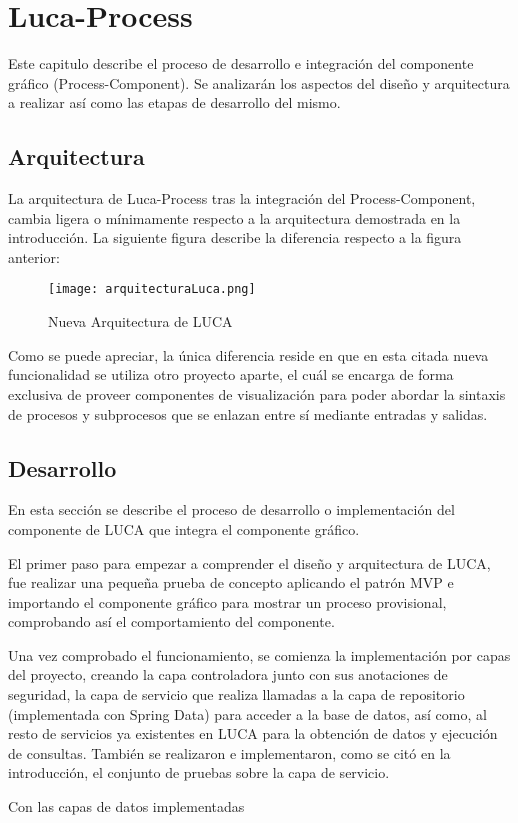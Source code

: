 \chapter{Luca-Process}
	
Este capitulo describe el proceso de desarrollo e integración del componente gráfico (Process-Component). Se analizarán los aspectos del diseño y arquitectura a realizar así como las etapas de desarrollo del mismo.
	
\section{Arquitectura}

La arquitectura  de Luca-Process tras la integración del Process-Component, cambia ligera o mínimamente respecto a la arquitectura demostrada en la introducción. La siguiente figura describe la diferencia respecto a la figura anterior:

\begin{figure}[H]
	\centering
	\texttt{[image: arquitecturaLuca.png]}
	\caption{Nueva Arquitectura de LUCA}\label{fig:arquitecturaLuca}
\end{figure}

Como se puede apreciar, la única diferencia reside en que en esta citada nueva funcionalidad se utiliza otro proyecto aparte, el cuál se encarga de forma exclusiva de proveer componentes de visualización para poder abordar la sintaxis de procesos y subprocesos que se enlazan entre sí mediante entradas y salidas.

\section{Desarrollo}

En esta sección se describe el proceso de desarrollo o implementación del componente de LUCA que integra el componente gráfico.

\vspace{5mm}

El primer paso para empezar a comprender el diseño y arquitectura de LUCA, fue realizar una pequeña prueba de concepto aplicando el patrón MVP\cite{mvp} e importando el componente gráfico para mostrar un proceso provisional, comprobando así el comportamiento del componente.


\vspace{5mm} 

Una vez comprobado el funcionamiento, se comienza la implementación por capas del proyecto, creando la capa controladora junto con sus anotaciones de seguridad, la capa de servicio que realiza llamadas a la capa de repositorio (implementada con Spring Data\cite{jpa}) para acceder a la base de datos, así como, al resto de servicios ya existentes en LUCA para la obtención de datos y ejecución de consultas. También se realizaron e implementaron, como se citó en la introducción, el conjunto de pruebas sobre la capa de servicio.

\vspace{5mm} 


Con las capas de datos implementadas


